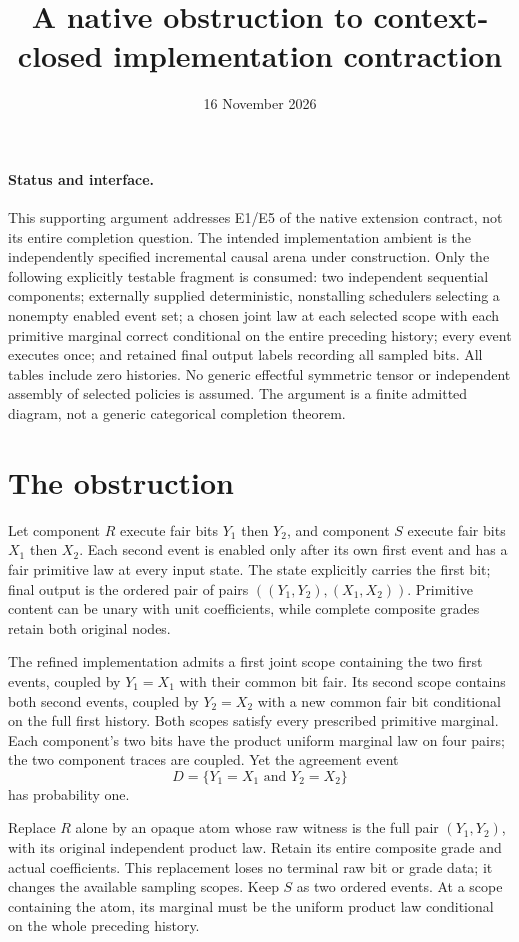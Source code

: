 \documentclass{article}
\title{A native obstruction to context-closed implementation contraction}
\date{16 November 2026}
\begin{document}
\maketitle
\paragraph{Status and interface.}
This supporting argument addresses E1/E5 of the native extension contract,
not its entire completion question. The intended implementation ambient is
the independently specified incremental causal arena under construction.
Only the following explicitly testable fragment is consumed: two independent
sequential components; externally supplied deterministic, nonstalling
schedulers selecting a nonempty enabled event set; a chosen joint law at each
selected scope with each primitive marginal correct conditional on the
entire preceding history; every event executes once; and retained final
output labels recording all sampled bits. All tables include zero histories.
No generic effectful symmetric tensor or independent assembly of selected
policies is assumed. The argument is a finite admitted diagram, not a generic
categorical completion theorem.

\section{The obstruction}
Let component $R$ execute fair bits $Y_1$ then $Y_2$, and component $S$
execute fair bits $X_1$ then $X_2$. Each second event is enabled only after
its own first event and has a fair primitive law at every input state.
The state explicitly carries the first bit; final output is the ordered pair
of pairs $((Y_1,Y_2),(X_1,X_2))$. Primitive content can be unary with unit
coefficients, while complete composite grades retain both original nodes.

The refined implementation admits a first joint scope containing the two
first events, coupled by $Y_1=X_1$ with their common bit fair. Its second scope
contains both second events, coupled by $Y_2=X_2$ with a new common fair bit
conditional on the full first history. Both scopes satisfy every prescribed
primitive marginal. Each component's two bits have the product uniform marginal law on four
pairs; the two component traces are coupled. Yet the agreement event
\[
 D=\{Y_1=X_1\text{ and }Y_2=X_2\}
\]
has probability one.

Replace $R$ alone by an opaque atom whose raw witness is the full pair
$(Y_1,Y_2)$, with its original independent product law. Retain its entire
composite grade and actual coefficients. This replacement loses no terminal
raw bit or grade data; it changes the available sampling scopes. Keep $S$
as two ordered events. At a scope containing the atom, its marginal must be
the uniform product law conditional on the whole preceding history.
\end{document}
